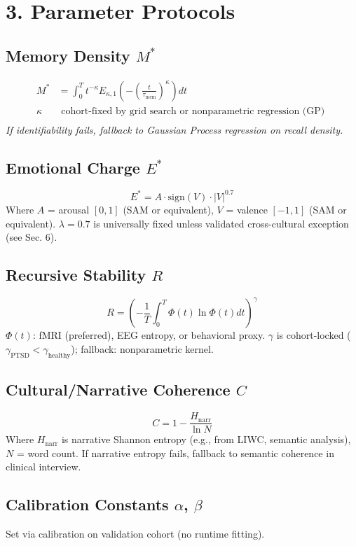 \documentclass[12pt]{article}
\begin{document}
\section*{3. Parameter Protocols}

\subsection*{Memory Density $M^*$}
\begin{align*}
M^* &= \int_{0}^{T} t^{-\kappa} E_{\kappa, 1} \left( -\left(\frac{t}{\tau_\mathrm{mem}}\right)^{\kappa} \right) dt \\
\kappa & \text{ cohort-fixed by grid search or nonparametric regression (GP) }\\
\end{align*}
\textit{If identifiability fails, fallback to Gaussian Process regression on recall density.}

\subsection*{Emotional Charge $E^*$}
\[
E^* = A \cdot \mathrm{sign}(V) \cdot |V|^{0.7}
\]
Where $A$ = arousal $[0,1]$ (SAM or equivalent), $V$ = valence $[-1,1]$ (SAM or equivalent).  
$\lambda=0.7$ is universally fixed unless validated cross-cultural exception (see Sec. 6).

\subsection*{Recursive Stability $R$}
\[
R = \left( -\frac{1}{T} \int_0^T \Phi(t) \ln \Phi(t) dt \right)^\gamma
\]
$\Phi(t)$: fMRI (preferred), EEG entropy, or behavioral proxy.  
$\gamma$ is cohort-locked ($\gamma_{\text{PTSD}} < \gamma_{\text{healthy}}$); fallback: nonparametric kernel.

\subsection*{Cultural/Narrative Coherence $C$}
\[
C = 1 - \frac{H_\mathrm{narr}}{\ln N}
\]
Where $H_\mathrm{narr}$ is narrative Shannon entropy (e.g., from LIWC, semantic analysis), $N$ = word count.  
If narrative entropy fails, fallback to semantic coherence in clinical interview.

\subsection*{Calibration Constants $\alpha$, $\beta$}
Set via calibration on validation cohort (no runtime fitting).
\end{document}
